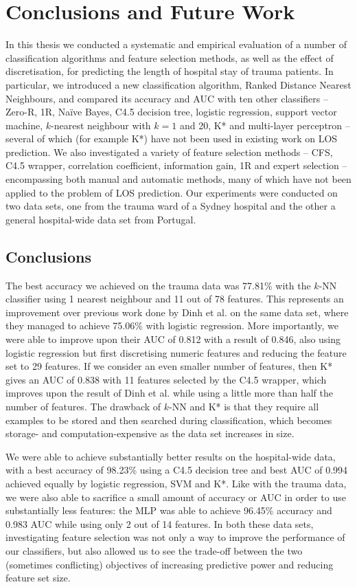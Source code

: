 \chapter{Conclusions and Future Work} \label{chap:conclusion}

In this thesis we conducted a systematic and empirical evaluation of a number
of classification algorithms and feature selection methods, as well as the
effect of discretisation, for predicting the length of hospital stay of trauma
patients. In particular, we introduced a new classification algorithm, Ranked
Distance Nearest Neighbours, and compared its accuracy and AUC with ten
other classifiers -- Zero-R, 1R, Na\"{i}ve Bayes, C4.5 decision tree, logistic
regression, support vector machine, $k$-nearest neighbour with $k=1$ and 20,
K* and multi-layer perceptron -- several of which (for example K*) have not
been used in existing work on LOS prediction. We also investigated a variety of
feature selection methods -- CFS, C4.5 wrapper, correlation coefficient,
information gain, 1R and expert selection -- encompassing both manual and
automatic methods, many of which have not been applied to the problem of LOS
prediction. Our experiments were conducted on two data sets, one from the
trauma ward of a Sydney hospital and the other a general hospital-wide data
set from Portugal.

\section{Conclusions}
The best accuracy we achieved on the trauma data was 77.81\% with the $k$-NN
classifier using 1 nearest neighbour and 11 out of 78 features. This represents
an improvement over previous work done by Dinh et al. \cite{Dinh2013a}
on the same data set,
where they managed to achieve 75.06\% with logistic regression. More
importantly, we were able to improve upon their AUC of 0.812 with a result of
0.846, also using logistic regression but first discretising numeric features
and reducing the feature set to 29 features.
If we consider an even smaller number of features, then K*
gives an AUC of 0.838 with 11 features selected by the C4.5 wrapper, which
improves upon the result of Dinh et al. \cite{Dinh2013a} while using a little
more than half
the number of features. The drawback of $k$-NN and K* is that they require all
examples to be stored and then searched during classification, which becomes
storage- and computation-expensive as the data set increases in size.

We were able to achieve substantially better results on the hospital-wide data,
with a best accuracy of 98.23\% using a C4.5 decision tree and best AUC of
0.994 achieved equally by logistic regression, SVM and K*. Like with the
trauma data, we were also able to sacrifice a small amount of accuracy or AUC
in order to use substantially less features: the MLP was able to achieve
96.45\% accuracy and 0.983 AUC while using only 2 out of 14 features. In both
these data sets, investigating feature selection was not only a way to
improve the performance of our classifiers, but also allowed us to see the
trade-off between the two (sometimes conflicting) objectives of increasing
predictive power and reducing feature set size.

